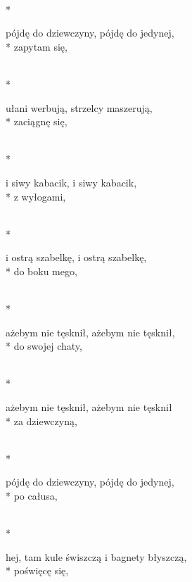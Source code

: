 \begin{lyrics}[longestline={hej, tam kule świszczą i bagnety błyszczą,}]

\\*
\begin{markverses}%
pójdę do dziewczyny, pójdę do jedynej,\\*
zapytam się,
\end{markverses}

\\*
\begin{markverses}%
ułani werbują, strzelcy maszerują,\\*
zaciągnę się,
\end{markverses}

\\*
\begin{markverses}%
i siwy kabacik, i siwy kabacik,\\*
z wyłogami,
\end{markverses}

\\*
\begin{markverses}%
i ostrą szabelkę, i ostrą szabelkę,\\*
do boku mego,
\end{markverses}

\\*
\begin{markverses}%
ażebym nie tęsknił, ażebym nie tęsknił,\\*
do swojej chaty,
\end{markverses}

\\*
\begin{markverses}%
ażebym nie tęsknił, ażebym nie tęsknił\\*
za dziewczyną,
\end{markverses}

\\*
\begin{markverses}%
pójdę do dziewczyny, pójdę do jedynej,\\*
po całusa,
\end{markverses}

\\*
\begin{markverses}%
hej, tam kule świszczą i bagnety błyszczą,\\*
poświęcę się,
\end{markverses}


\end{lyrics}
